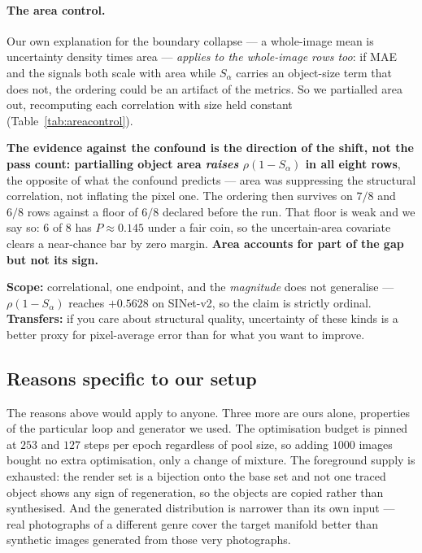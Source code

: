 \documentclass{article} %
\begin{document}
\paragraph{The area control.} Our own explanation for the boundary collapse --- a whole-image mean is
uncertainty density times area --- \emph{applies to the whole-image rows too}: if MAE and the signals
both scale with area while $S_\alpha$ carries an object-size term that does not, the ordering could
be an artifact of the metrics. So we partialled area out, recomputing each correlation with size
held constant (Table~\ref{tab:areacontrol}).

\textbf{The evidence against the confound is the direction of the shift, not the pass count:
partialling object area \emph{raises} $\rho(1-S_\alpha)$ in all eight rows}, the opposite of what the
confound predicts --- area was suppressing the structural correlation, not inflating the pixel one.
The ordering then survives on $7/8$ and $6/8$ rows against a floor of $6/8$ declared before the run.
That floor is weak and we say so: $6$ of $8$ has $P \approx 0.145$ under a fair coin, so the
uncertain-area covariate clears a near-chance bar by zero margin. \textbf{Area accounts for part of
the gap but not its sign.}

\textbf{Scope:} correlational, one endpoint, and the \emph{magnitude} does not generalise ---
$\rho(1-S_\alpha)$ reaches $+0.5628$ on SINet-v2, so the claim is strictly ordinal.
\textbf{Transfers:} if you care about structural quality, uncertainty of these kinds is a better
proxy for pixel-average error than for what you want to improve.

\subsection{Reasons specific to our setup}
\label{sec:diss-instantiation}

The reasons above would apply to anyone. Three more are ours alone, properties of the particular loop
and generator we used. The optimisation budget is pinned at $253$ and $127$ steps per epoch
regardless of pool size, so adding $1000$ images bought no extra optimisation, only a change of
mixture. The foreground supply is exhausted: the render set is a bijection onto the base set and not
one traced object shows any sign of regeneration, so the objects are copied rather than synthesised.
And the generated distribution is narrower than its own input --- real photographs of a different
genre cover the target manifold better than synthetic images generated from those very
photographs.
\end{document}
